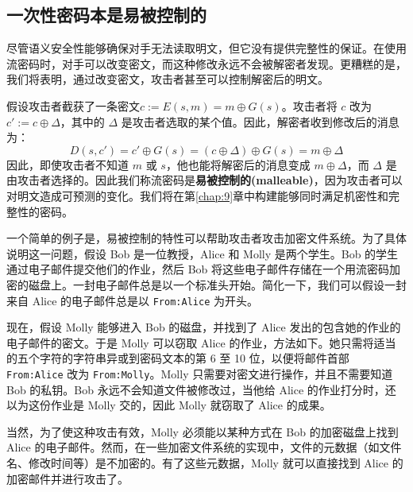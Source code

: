 \subsection{一次性密码本是易被控制的}

尽管语义安全性能够确保对手无法读取明文，但它没有提供完整性的保证。在使用流密码时，对手可以改变密文，而这种修改永远不会被解密者发现。更糟糕的是，我们将表明，通过改变密文，攻击者甚至可以控制解密后的明文。

假设攻击者截获了一条密文$c:=E(s,m)=m\oplus G(s)$。攻击者将 $c$ 改为 $c':=c\oplus\Delta$，其中的 $\Delta$ 是攻击者选取的某个值。因此，解密者收到修改后的消息为：
$$
D(s,c')=c'\oplus G(s)=(c\oplus\Delta)\oplus G(s)=m\oplus\Delta
$$
因此，即使攻击者不知道 $m$ 或 $s$，他也能将解密后的消息变成 $m\oplus\Delta$，而 $\Delta$ 是由攻击者选择的。因此我们称流密码是\textbf{易被控制的(malleable)}，因为攻击者可以对明文造成可预测的变化。我们将在第\ref{chap:9}章中构建能够同时满足机密性和完整性的密码。

一个简单的例子是，易被控制的特性可以帮助攻击者攻击加密文件系统。为了具体说明这一问题，假设 Bob 是一位教授，Alice 和 Molly 是两个学生。Bob 的学生通过电子邮件提交他们的作业，然后 Bob 将这些电子邮件存储在一个用流密码加密的磁盘上。一封电子邮件总是以一个标准头开始。简化一下，我们可以假设一封来自 Alice 的电子邮件总是以 \texttt{From:Alice} 为开头。

现在，假设 Molly 能够进入 Bob 的磁盘，并找到了 Alice 发出的包含她的作业的电子邮件的密文。于是 Molly 可以窃取 Alice 的作业，方法如下。她只需将适当的五个字符的字符串异或到密码文本的第 6 至 10 位，以便将邮件首部 \texttt{From:Alice} 改为 \texttt{From:Molly}。Molly 只需要对密文进行操作，并且不需要知道 Bob 的私钥。Bob 永远不会知道文件被修改过，当他给 Alice 的作业打分时，还以为这份作业是 Molly 交的，因此 Molly 就窃取了 Alice 的成果。

当然，为了使这种攻击有效，Molly 必须能以某种方式在 Bob 的加密磁盘上找到 Alice 的电子邮件。然而，在一些加密文件系统的实现中，文件的元数据（如文件名、修改时间等）是不加密的。有了这些元数据，Molly 就可以直接找到 Alice 的加密邮件并进行攻击了。